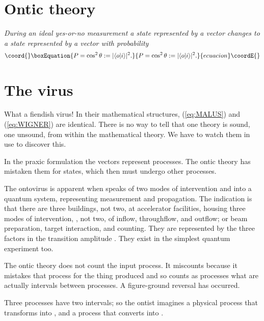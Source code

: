 \documentclass[a4paper,11pt]{article}
\begin{document}
\section{Ontic theory}

{\em During an ideal yes-or-no measurement 
a state represented
by a vector \coordHE{}
changes 
to a state represented by a vector \coordHE{}
with probability}
\begin{equation}\coord{}\boxEquation{
\label{eq:WIGNER}
P=\cos^2 \theta := |\langle o |i\rangle|^2\/.
}{
P=\cos^2 \theta := |\langle o |i\rangle|^2\/.
}{ecuacion}\coordE{}\end{equation}

\section{The virus}

What a fiendish virus!
In their mathematical structures,
 (\ref{eq:MALUS}) and (\ref{eq:WIGNER})
are identical. 
There is no way to tell that one 
theory is sound, one unsound,
from within the mathematical theory.
We have to watch them in use to discover this.

In the praxic formulation the vectors represent
processes.
The ontic theory has mistaken them for 
states,
which then must undergo other processes.

The ontovirus is apparent
when \cite{NEUMANN}
speaks of two modes of intervention
\coordHE{} and \coordHE{}
into a quantum system,
representing  measurement and propagation.
The indication is that
there are three buildings, not two,
at accelerator facilities,
housing three modes of intervention,
\coordHE{},
not two,
 of
inflow, throughflow, and outflow;
or beam preparation,
target interaction,
and counting.
They are represented by the three factors
in the transition amplitude
\coordHE{}.
They  exist in the simplest quantum experiment too.

The ontic
theory does not count the input process.
It miscounts because
it mistakes that process for the thing produced
and so counts as processes  
what are actually
intervals between processes.
A figure-ground reversal 
has occurred.

Three processes have two intervals;
so the ontist imagines a physical process \coordHE{}
 that transforms \coordHE{} into
\coordHE{}, and a process \coordHE{}  that converts 
\coordHE{} into \coordHE{}.
\end{document}
